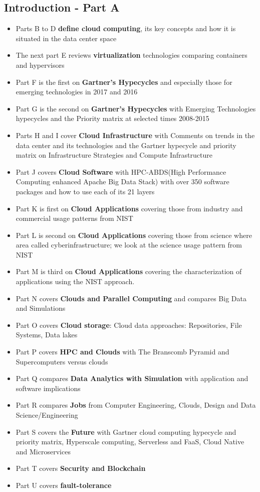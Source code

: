 \subsection{Introduction - Part A}\label{s:cloud-fundamentals-a}
\begin{itemize}
\item Parts B to D \textbf{define cloud computing}, its key concepts and how it is situated in the data center space
\item The next part E reviews \textbf{virtualization} technologies comparing containers and hypervisors
\item Part F is the first on \textbf{Gartner’s Hypecycles} and especially those for emerging technologies in 2017 and 2016
\item Part G is the second on \textbf{Gartner’s Hypecycles} with Emerging Technologies hypecycles and the Priority matrix at selected times 2008-2015
\item Parts H and I cover \textbf{Cloud Infrastructure} with Comments on trends in the data center and its technologies and the Gartner hypecycle and priority matrix on Infrastructure Strategies and Compute Infrastructure
\item Part J covers \textbf{Cloud Software} with HPC-ABDS(High Performance Computing enhanced Apache Big Data Stack) with over 350 software packages and how to use each of its 21 layers
\item Part K is first on \textbf{Cloud Applications} covering those from industry and commercial usage patterns from NIST
\item Part L is second on \textbf{Cloud Applications} covering those from science where area called cyberinfrastructure; we look at the science usage pattern from NIST
\item Part M is third on \textbf{Cloud Applications} covering the characterization of applications using the NIST approach.
\item Part N covers \textbf{Clouds and Parallel Computing} and compares Big Data and Simulations
\item Part O covers \textbf{Cloud storage}: Cloud data approaches: Repositories, File Systems, Data lakes
\item Part P  covers \textbf{HPC and Clouds} with The Branscomb Pyramid and Supercomputers versus clouds
\item Part Q compares \textbf{Data Analytics with Simulation} with application and software implications
\item Part R compares \textbf{Jobs} from Computer Engineering, Clouds, Design and Data Science/Engineering
\item Part S covers the \textbf{Future} with Gartner cloud computing hypecycle and priority matrix, Hyperscale computing, Serverless and FaaS, Cloud Native and Microservices
\item Part T covers \textbf{Security and Blockchain}
\item Part U covers \textbf{fault-tolerance}
\end{itemize}

